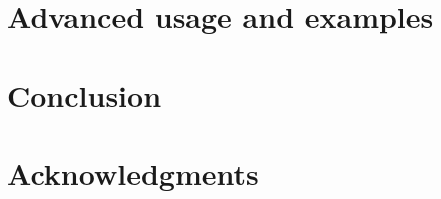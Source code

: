 \documentclass[article]{jss}
\begin{document}
\hypertarget{advanced-usage-and-examples}{%
\section{Advanced usage and
examples}\label{advanced-usage-and-examples}}

\hypertarget{conclusion}{%
\section{Conclusion}\label{conclusion}}

\hypertarget{acknowledgments}{%
\section*{Acknowledgments}\label{acknowledgments}}

\renewcommand\refname{References}

\end{document}
